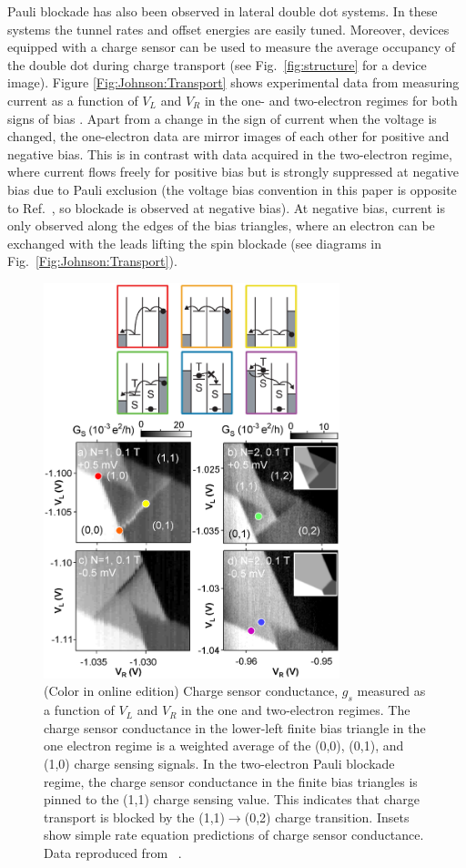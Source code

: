 \documentclass[rmp,twocolumn,aps]{revtex4}
\begin{document}
Pauli blockade has also been observed in lateral double dot
systems. In these systems the tunnel rates and offset energies are
easily tuned. Moreover, devices equipped with a charge sensor can
be used to measure the average occupancy of the double dot during
charge transport (see Fig.\ \ref{fig:structure} for a device
image). Figure \ref{Fig:Johnson:Transport} shows experimental data
from measuring current as a function of $V_L$ and $V_R$ in the one-
and two-electron regimes for both signs of bias
\cite{JohnsonSpinBlock}. Apart from a change in the sign of
current when the voltage is changed, the one-electron data are
mirror images of each other for positive and negative bias. This
is in contrast with data acquired in the two-electron regime,
where current flows freely for positive bias but is strongly
suppressed at negative bias due to Pauli exclusion (the voltage
bias convention in this paper is opposite to Ref.\
\cite{OnoSpinBlock}, so blockade is observed at negative bias). At
negative bias, current is only observed along the edges of the
bias triangles, where an electron can be exchanged with the leads
lifting the spin blockade (see diagrams in Fig.\ \ref{Fig:Johnson:Transport}).

\begin{figure}[hbt]
\begin{center}
\includegraphics[width=8.6cm]{hanson_fig35.eps}
\end{center}
\caption{(Color in online edition) Charge sensor conductance, $g_s$
measured as a function of $V_L$ and $V_R$ in the one and
two-electron regimes. The charge sensor conductance in the
lower-left finite bias triangle in the one electron regime is a
weighted average of the (0,0), (0,1), and (1,0) charge sensing
signals. In the two-electron Pauli blockade regime, the charge
sensor conductance in the finite bias triangles is pinned to the
(1,1) charge sensing value. This indicates that charge transport
is blocked by the (1,1)$\rightarrow$(0,2) charge transition.
Insets show simple rate equation predictions of charge sensor
conductance. Data
reproduced from ~\textcite{JohnsonSpinBlock}.}%
\label{Fig:Johnson:Sensing}
\end{figure}
\end{document}
